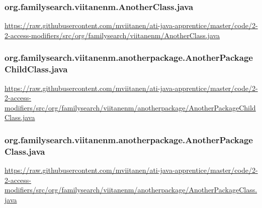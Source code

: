 \vspace{1em}
\subsubsection*{org.familysearch.viitanenm.AnotherClass.java}
\noindent
\begin{minipage}{.6in}
\end{minipage}
\begin{minipage}{6in}
  \url{https://raw.githubusercontent.com/mviitanen/ati-java-apprentice/master/code/2-2-access-modifiers/src/org/familysearch/viitanenm/AnotherClass.java}
\end{minipage}

\vspace{1em}
\subsubsection*{org.familysearch.viitanenm.anotherpackage.AnotherPackageChildClass.java}
\noindent
\begin{minipage}{.6in}
\end{minipage}
\begin{minipage}{6in}
  \url{https://raw.githubusercontent.com/mviitanen/ati-java-apprentice/master/code/2-2-access-modifiers/src/org/familysearch/viitanenm/anotherpackage/AnotherPackageChildClass.java}
\end{minipage}

\vspace{1em}
\subsubsection*{org.familysearch.viitanenm.anotherpackage.AnotherPackageClass.java}
\noindent
\begin{minipage}{.6in}
\end{minipage}
\begin{minipage}{6in}
  \url{https://raw.githubusercontent.com/mviitanen/ati-java-apprentice/master/code/2-2-access-modifiers/src/org/familysearch/viitanenm/anotherpackage/AnotherPackageClass.java}
\end{minipage}

